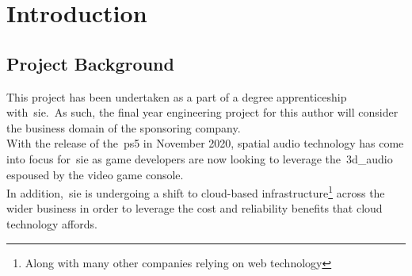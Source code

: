 \thispagestyle{plain}
\newpage
\section{Introduction}\label{sec:introduction}
\subsection{Project Background}\label{subsec:project-background}
\normalsize

This project has been undertaken as a part of a degree apprenticeship with~\gls{sie}.\
As such, the final year engineering project for this author will consider the business domain of the sponsoring company.\\

With the release of the~\gls{ps5} in November 2020, spatial audio technology has come into focus for~\gls{sie} as game developers are now looking to leverage the~\gls{3d_audio} espoused by the video game console.\\

In addition,~\gls{sie} is undergoing a shift to cloud-based infrastructure\footnote{Along with many other companies relying on web technology} across the wider business in order to leverage the cost and reliability benefits that cloud technology affords.\\

